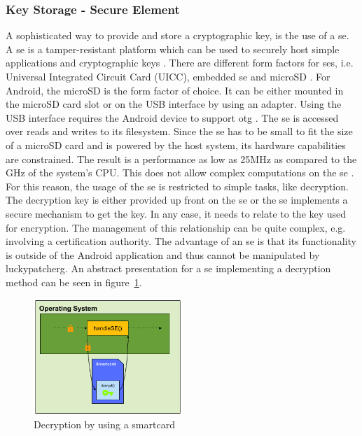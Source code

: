 \subsubsection{Key Storage - Secure Element} \label{section:counter-replace-encryption-key-local}
A sophisticated way to provide and store a cryptographic key, is the use of a \gls{se}.
\newline
A \gls{se} is a tamper-resistant platform which can be used to securely host simple applications and cryptographic keys \cite{seDefinition}.
There are different form factors for \gls{se}s, i.e. Universal Integrated Circuit Card (UICC), embedded \gls{se} and microSD \cite{seDefinition}.
For Android, the microSD is the form factor of choice.
It can be either mounted in the microSD card slot or on the USB interface by using an adapter.
Using the USB interface requires the Android device to support \gls{otg} \cite{usbOtg}.
The \gls{se} is accessed over reads and writes to its filesystem.
Since the \gls{se} has to be small to fit the size of a microSD card and is powered by the host system, its hardware capabilities are constrained.
The result is a performance as low as 25MHz as compared to the GHz of the system's CPU.
This does not allow complex computations on the \gls{se} \cite{stSe}.
For this reason, the usage of the \gls{se} is restricted to simple tasks, like decryption.
The decryption key is either provided up front on the \gls{se} or the \gls{se} implements a secure mechanism to get the key.
In any case, it needs to relate to the key used for encryption.
The management of this relationship can be quite complex, e.g. involving a certification authority.
The advantage of an \gls{se} is that its functionality is outside of the Android application and thus cannot be manipulated by \gls{luckypatcherg}.
\newline
An abstract presentation for a \gls{se} implementing a decryption method can be seen in figure~\ref{fig:encryptionKeySmart}.
\newline
\begin{figure}[h]
    \centering
    \includegraphics[width=0.5\textwidth]{data/encryptionKeySmart.png}
    \caption{Decryption by using a smartcard}
    \label{fig:encryptionKeySmart}
\end{figure}

